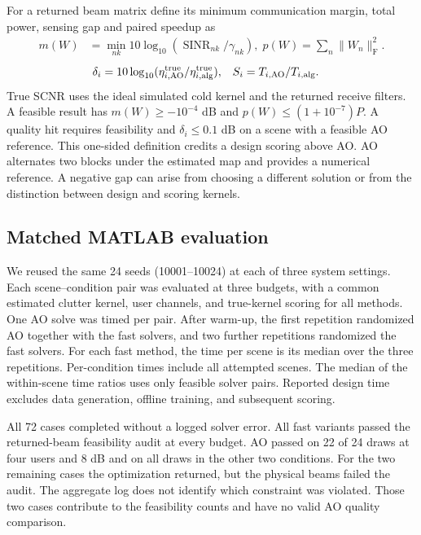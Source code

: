 \documentclass[journal]{IEEEtran}
\newcommand{\F}{_{\mathrm F}}
\newcommand{\sn}{\operatorname{SINR}}
\newcommand{\norm}[1]{\lVert #1\rVert}
\begin{document}
For a returned beam matrix define its minimum communication margin, total power, sensing gap and paired speedup as
\begin{align}
 m(W)&=\min_{nk}10\log_{10}(\sn_{nk}/\gamma_{nk}),\;
 p(W)=\sum_n\norm{W_n}\F^2.
\end{align}
\begin{align}
 \delta_i&=10\log_{10}(\eta^{\rm true}_{i,\rm AO}/
                               \eta^{\rm true}_{i,\rm alg}),&
 S_i&=T_{i,\rm AO}/T_{i,\rm alg}.
\end{align}
True SCNR uses the ideal simulated cold kernel and the returned receive filters. A feasible result has $m(W)\ge-10^{-4}$ dB and $p(W)\le(1+10^{-7})P$. A quality hit requires feasibility and $\delta_i\le0.1$ dB on a scene with a feasible AO reference. This one-sided definition credits a design scoring above AO. AO alternates two blocks under the estimated map and provides a numerical reference. A negative gap can arise from choosing a different solution or from the distinction between design and scoring kernels.

\subsection{Matched MATLAB evaluation}
We reused the same 24 seeds (10001--10024) at each of three system settings. Each scene--condition pair was evaluated at three budgets, with a common estimated clutter kernel, user channels, and true-kernel scoring for all methods. One AO solve was timed per pair. After warm-up, the first repetition randomized AO together with the fast solvers, and two further repetitions randomized the fast solvers. For each fast method, the time per scene is its median over the three repetitions. Per-condition times include all attempted scenes. The median of the within-scene time ratios uses only feasible solver pairs. Reported design time excludes data generation, offline training, and subsequent scoring.

All 72 cases completed without a logged solver error. All fast variants passed the returned-beam feasibility audit at every budget. AO passed on 22 of 24 draws at four users and 8 dB and on all draws in the other two conditions. For the two remaining cases the optimization returned, but the physical beams failed the audit. The aggregate log does not identify which constraint was violated. Those two cases contribute to the feasibility counts and have no valid AO quality comparison.
\end{document}
